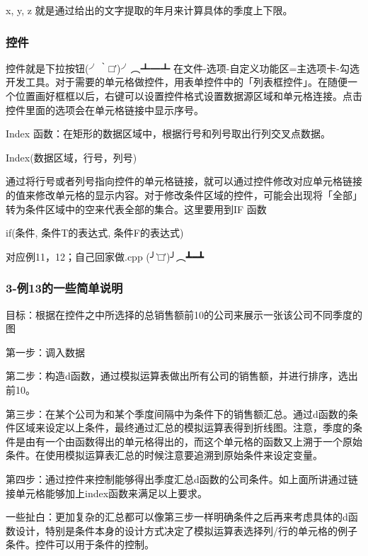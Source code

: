 \documentclass[10pt, a4paper]{article}
\begin{document}
                x, y, z 就是通过给出的文字提取的年月来计算具体的季度上下限。

            \subsubsection{控件}
            控件就是下拉按钮(╯‵□′)╯︵┻━┻ 在文件-选项-自定义功能区=主选项卡-勾选开发工具。对于需要的单元格做控件，用表单控件中的「列表框控件」。在随便一个位置画好框框以后，右键可以设置控件格式设置数据源区域和单元格连接。点击控件里面的选项会在单元格链接中显示序号。 
                
            Index 函数：在矩形的数据区域中，根据行号和列号取出行列交叉点数据。
            \begin{center}
                Index(数据区域，行号，列号)
            \end{center}

            通过将行号或者列号指向控件的单元格链接，就可以通过控件修改对应单元格链接的值来修改单元格的显示内容。对于修改条件区域的控件，可能会出现将「全部」转为条件区域中的空来代表全部的集合。这里要用到IF 函数

            \begin{center}
                if(条件, 条件T的表达式, 条件F的表达式)
            \end{center}

            对应例11，12；自己回家做.cpp (╯‵□′)╯︵┻━┻ 

            \subsubsection{3-例13的一些简单说明}
                目标：根据在控件之中所选择的总销售额前10的公司来展示一张该公司不同季度的图

                第一步：调入数据
                
                第二步：构造d函数，通过模拟运算表做出所有公司的销售额，并进行排序，选出前10。
                
                第三步：在某个公司为和某个季度间隔中为条件下的销售额汇总。通过d函数的条件区域来设定以上条件，最终通过汇总的模拟运算表得到折线图。注意，季度的条件是由有一个由函数得出的单元格得出的，而这个单元格的函数又上溯于一个原始条件。在使用模拟运算表汇总的时候注意要追溯到原始条件来设定变量。
                
                第四步：通过控件来控制能够得出季度汇总d函数的公司条件。如上面所讲通过链接单元格能够加上index函数来满足以上要求。

                一些扯白：更加复杂的汇总都可以像第三步一样明确条件之后再来考虑具体的d函数设计，特别是条件本身的设计方式决定了模拟运算表选择列/行的单元格的例子条件。控件可以用于条件的控制。
\end{document}
